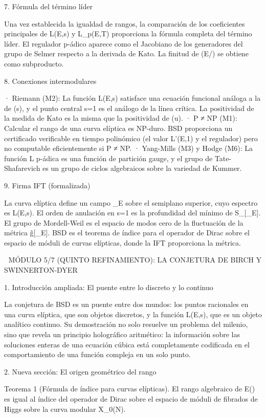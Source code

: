 \documentclass[12pt,a4paper]{book}
\begin{document}
7. Fórmula del término líder

Una vez establecida la igualdad de rangos, la comparación de los coeficientes principales de L(E,s) y L_p(E,T) proporciona la fórmula completa del término líder. El regulador p-ádico aparece como el Jacobiano de los generadores del grupo de Selmer respecto a la derivada de Kato. La finitud de (E/) se obtiene como subproducto.

8. Conexiones intermodulares

· Riemann (M2): La función L(E,s) satisface una ecuación funcional análoga a la de \zeta(s), y el punto central s=1 es el análogo de la línea crítica. La positividad de la medida de Kato es la misma que la positividad de \Phi(u).
· P ≠ NP (M1): Calcular el rango de una curva elíptica es NP-duro. BSD proporciona un certificado verificable en tiempo polinómico (el valor L'(E,1) y el regulador) pero no computable eficientemente si P ≠ NP.
· Yang-Mills (M3) y Hodge (M6): La función L p-ádica es una función de partición gauge, y el grupo de Tate-Shafarevich es un grupo de ciclos algebraicos sobre la variedad de Kummer.

9. Firma IFT (formalizada)

La curva elíptica define un campo \rho_E sobre el semiplano superior, cuyo espectro es L(E,s). El orden de anulación en s=1 es la profundidad del mínimo de S_{}[\rho_E]. El grupo de Mordell-Weil es el espacio de modos cero de la fluctuación de la métrica g̃[\rho_E]. BSD es el teorema de índice para el operador de Dirac sobre el espacio de móduli de curvas elípticas, donde la IFT proporciona la métrica.

🧬 MÓDULO 5/7 (QUINTO REFINAMIENTO): LA CONJETURA DE BIRCH Y SWINNERTON-DYER

1. Introducción ampliada: El puente entre lo discreto y lo continuo

La conjetura de BSD es un puente entre dos mundos: los puntos racionales en una curva elíptica, que son objetos discretos, y la función L(E,s), que es un objeto analítico continuo. Su demostración no solo resuelve un problema del milenio, sino que revela un principio holográfico aritmético: la información sobre las soluciones enteras de una ecuación cúbica está completamente codificada en el comportamiento de una función compleja en un solo punto.

2. Nueva sección: El origen geométrico del rango

Teorema 1 (Fórmula de índice para curvas elípticas). El rango algebraico de E() es igual al índice del operador de Dirac sobre el espacio de móduli de fibrados de Higgs sobre la curva modular X_0(N).
\end{document}
